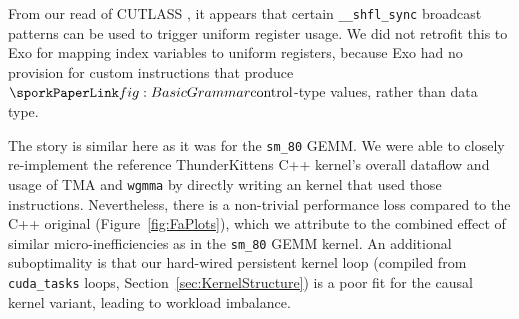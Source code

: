 From our read of CUTLASS \cite{cutlass},
it appears that certain \texttt{\_\_shfl\_sync} broadcast patterns can be used to trigger
uniform register usage.
We did not retrofit this to Exo for mapping index variables to uniform registers,
because Exo had no provision for custom instructions that produce $\sporkcontrol$-type values,
rather than data type.



The story is similar here as it was for the \texttt{sm\_80} GEMM.
We were able to closely re-implement the reference ThunderKittens C++ kernel's
overall dataflow and usage of TMA and \texttt{wgmma}
by directly writing an \sporkName{} kernel that used those instructions.
Nevertheless, there is a non-trivial performance loss compared to the C++ original (Figure~\ref{fig:FaPlots}),
which we attribute to the combined effect of similar micro-inefficiencies as in the \texttt{sm\_80} GEMM kernel.
An additional suboptimality is that our hard-wired persistent kernel loop
(compiled from \texttt{cuda\_tasks} loops, Section~\ref{sec:KernelStructure})
is a poor fit for the causal kernel variant, leading to workload imbalance.



